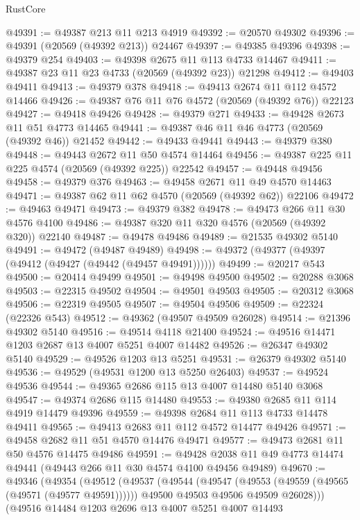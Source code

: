 \begin{lexlean}{RustCore}
\begin{coremodule}
@49391 := @49387 @213 @11 @213 @4919
@49392 := @20570 @49302
@49396 := @49391 (@20569 (@49392 @213)) @24467
@49397 := @49385 @49396
@49398 := @49379 @254
@49403 := @49398 @2675 @11 @113 @4733 @14467
@49411 := @49387 @23 @11 @23 @4733 (@20569 (@49392 @23)) @21298
@49412 := @49403 @49411
@49413 := @49379 @378
@49418 := @49413 @2674 @11 @112 @4572 @14466
@49426 := @49387 @76 @11 @76 @4572 (@20569 (@49392 @76)) @22123
@49427 := @49418 @49426
@49428 := @49379 @271
@49433 := @49428 @2673 @11 @51 @4773 @14465
@49441 := @49387 @46 @11 @46 @4773 (@20569 (@49392 @46)) @21452
@49442 := @49433 @49441
@49443 := @49379 @380
@49448 := @49443 @2672 @11 @50 @4574 @14464
@49456 := @49387 @225 @11 @225 @4574 (@20569 (@49392 @225)) @22542
@49457 := @49448 @49456
@49458 := @49379 @376
@49463 := @49458 @2671 @11 @49 @4570 @14463
@49471 := @49387 @62 @11 @62 @4570 (@20569 (@49392 @62)) @22106
@49472 := @49463 @49471
@49473 := @49379 @382
@49478 := @49473 @266 @11 @30 @4576 @4100
@49486 := @49387 @320 @11 @320 @4576 (@20569 (@49392 @320)) @22140
@49487 := @49478 @49486
@49489 := @21535 @49302 @5140
@49491 := @49472 (@49487 @49489)
@49498 := @49372 (@49377 (@49397 (@49412 (@49427 (@49442 (@49457 @49491))))))
@49499 := @20217 @543
@49500 := @20414 @49499
@49501 := @49498 @49500
@49502 := @20288 @3068
@49503 := @22315 @49502
@49504 := @49501 @49503
@49505 := @20312 @3068
@49506 := @22319 @49505
@49507 := @49504 @49506
@49509 := @22324 (@22326 @543)
@49512 := @49362 (@49507 @49509 @26028)
@49514 := @21396 @49302 @5140
@49516 := @49514 @4118 @21400
@49524 := @49516 @14471 @1203 @2687 @13 @4007 @5251 @4007 @14482
@49526 := @26347 @49302 @5140
@49529 := @49526 @1203 @13 @5251
@49531 := @26379 @49302 @5140
@49536 := @49529 (@49531 @1200 @13 @5250 @26403)
@49537 := @49524 @49536
@49544 := @49365 @2686 @115 @13 @4007 @14480 @5140 @3068
@49547 := @49374 @2686 @115 @14480
@49553 := @49380 @2685 @11 @114 @4919 @14479 @49396
@49559 := @49398 @2684 @11 @113 @4733 @14478 @49411
@49565 := @49413 @2683 @11 @112 @4572 @14477 @49426
@49571 := @49458 @2682 @11 @51 @4570 @14476 @49471
@49577 := @49473 @2681 @11 @50 @4576 @14475 @49486
@49591 := @49428 @2038 @11 @49 @4773 @14474 @49441 (@49443 @266 @11 @30 @4574 @4100 @49456 @49489)
@49670 := @49346
    (@49354
      (@49512
        (@49537
          (@49544
            (@49547 (@49553 (@49559 (@49565 (@49571 (@49577 @49591))))))
            @49500
            @49503
            @49506
            @49509
            @26028)))
      (@49516
        @14484
        @1203
        @2696
        @13
        @4007
        @5251
        @4007
        @14493

\end{coremodule}
\end{lexlean}
